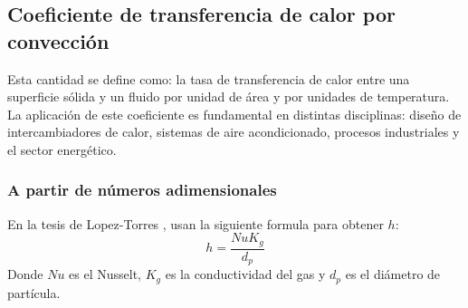 \documentclass[12pt,letterpaper,final]{article}%
\begin{document}
\subsection{Coeficiente de transferencia de calor por convección}
Esta cantidad se define como: la tasa de transferencia de calor entre una superficie sólida y un fluido por unidad de área y por unidades de temperatura\cite{thermal2023conveccion}. La aplicación de este coeficiente es fundamental en distintas disciplinas: diseño de intercambiadores de calor, sistemas de aire acondicionado, procesos industriales y el sector energético.
\subsubsection{A partir de números adimensionales}
En la tesis de Lopez-Torres \cite{Lopez2014}, usan la siguiente formula para obtener $h$:
\begin{equation}\label{Ecu_h_lopez}
	h = \frac{Nu K_g}{d_p}
\end{equation}
Donde $Nu$ es el Nusselt, $K_g$ es la conductividad del gas y $d_p$ es el diámetro de partícula.
\newpage
\printbibliography
\end{document}
